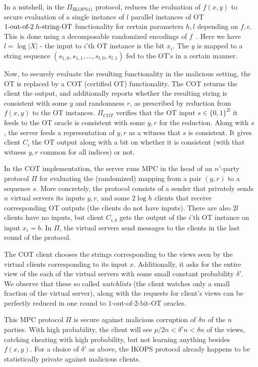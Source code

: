\documentclass[a4paper]{article}
\newcommand{\OT}[2]{#1\text{-out-of-}#2\text{-bit-OT}}
\newcommand{\sOT}[3]{#1\text{-out-of-}#2\text{\;$#3$-string-OT}}
\begin{document}
In a nutshell, in the $\Pi_{\text{IKOPS11}}$ protocol, reduces the evaluation of $f(x,y)$ to secure evaluation of a single instance of $l$ parallel instances of OT $\sOT{1}{2}{h}$ functionality for certain parameters $h,l$ depending on $f,\epsilon$. This is done using a decomposable randomized encodings of $f$~\cite{IK02}. Here we have $l=\log{|X|}$ - the input to $i$'th OT instance is the bit $x_i$. 
The $y$ is mapped to a string sequence ${(s_{1,0},s_{1,1},\ldots,s_{l,0},s_{l,1})}$ fed to the OT's in a certain manner.

Now, to securely evaluate the resulting functionality in the malicious setting, the OT is replaced by a COT (certified OT) functionality. The COT returns the client the output, and additionally reports whether the resulting string is consistent with some $y$ and randomness $r$, as prescribed by reduction from $f(x,y)$ to the OT instances. 
$\Pi_{COT}$ verifies that the OT input $s\in\{0,1\}^{2l}$ it feeds to the OT oracle is consistent with some $y,r$ for the reduction. 
Along with $s$, the server feeds a representation of $y,r$ as a witness that $s$ is consistent.
It gives client $C_i$ 
the OT output along with a bit on whether it is consistent (with that witness $y,r$ common for all indices) or not.

In the COT implementation, the server runs MPC in the head of an $n'$-party protocol $\Pi$ for evaluating the (randomized) mapping from a pair $(y,r)$ to a sequence $s$. More concretely, the protocol consists of a sender that privately sends $n$ virtual servers its inputs $y,r$, and some $2\log{h}$ clients that receive corresponding OT outputs (the clients do not have inputs). There are also $2l$ clients have no inputs, but client $C_{i,b}$ gets the output of the $i$'th OT instance on input $x_i=b$. 
In $\Pi$, the virtual servers send messages to the clients in the last round of the protocol.

The COT client chooses the strings corresponding to the views seen by the virtual clients corresponding to its input $x$. Additionally, it asks for the entire view of the each of the virtual servers with some small constant probability $\delta'$. We observe that these so called \emph{watchlists} (the client watches only a small fraction of the virtual server), along with the requests for client's views can be perfectly reduced in one round to $\OT{1}{2}$ oracles.


This MPC protocol $\Pi$ is secure against malicious corruption of $\delta n$ of the $n$ parties. With high probability, the client will see $p/2n < \delta' n<\delta n$ of the views, catching cheating with high probability, but not learning anything besides $f(x,y)$.  
For a choice of $\delta'$ as above, the IKOPS protocol already happens to be statistically private against malicious clients.
\end{document}
